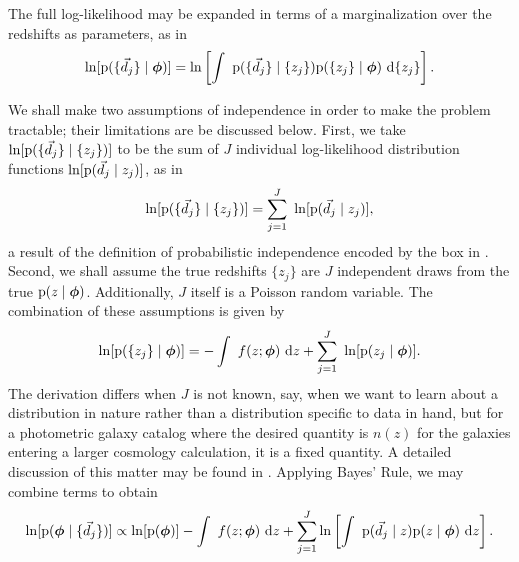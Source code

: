 The full log-likelihood may be expanded in terms of a marginalization over the redshifts as parameters, as in 
\begin{equation}
\eqlabel{eq:marginalize}
\ln[\pr{\{\data_{j}\} \gvn \ndphi}] = \ln\left[\integral{\pr{\{\data_{j}\} \gvn \{z_{j}\}} \pr{\{z_{j}\} \gvn \ndphi}}{\{z_{j}\}}\right].
\end{equation}

We shall make two assumptions of independence in order to make the problem tractable; their limitations are be discussed below.  
First, we take $\ln[\mathrm{p}(\{\vec{d}_{j}\} \mid \{z_{j}\})]$ to be the sum of $J$ individual log-likelihood distribution functions $\ln[\mathrm{p}(\vec{d}_{j} \mid z_{j})]$, as in 
\begin{equation}
\eqlabel{eq:indiedat}
\ln[\pr{\{\data_{j}\} \gvn \{z_{j}\}}] = \sum_{j=1}^{J}\ \ln[\pr{\data_{j} \gvn z_{j}}],
\end{equation}
a result of the definition of probabilistic independence encoded by the box in .
Second, we shall assume the true redshifts $\{z_{j}\}$ are $J$ independent draws from the true $\mathrm{p}(z \mid {\ensuremath{\boldsymbol{\phi}}})$.  
Additionally, $J$ itself is a Poisson random variable.  
The combination of these assumptions is given by 
\begin{equation}
\eqlabel{eq:indie}
\ln[\pr{\{z_{j}\} \gvn \ndphi}] = -\integral{f(z; \ndphi)}{z} + \sum_{j=1}^{J}\ \ln[\pr{z_{j} \gvn \ndphi}].
\end{equation}
The derivation differs when $J$ is not known, say, when we want to learn about a distribution in nature rather than a distribution specific to data in hand, but for a photometric galaxy catalog where the desired quantity is $n(z)$ for the galaxies entering a larger cosmology calculation, it is a fixed quantity.
A detailed discussion of this matter may be found in \citet{Foreman-Mackey2014}.  
Applying Bayes' Rule, we may combine terms to obtain 
\begin{equation}
\eqlabel{eq:posterior}
\ln[\pr{\ndphi \gvn \{\data_{j}\}}] \propto \ln[\pr{\ndphi}] - \integral{f(z; \ndphi)}{z} + \sum_{j=1}^{J}\ln\left[\integral{\pr{\data_{j} \gvn z} \pr{z \gvn \ndphi}}{z}\right].
\end{equation}

